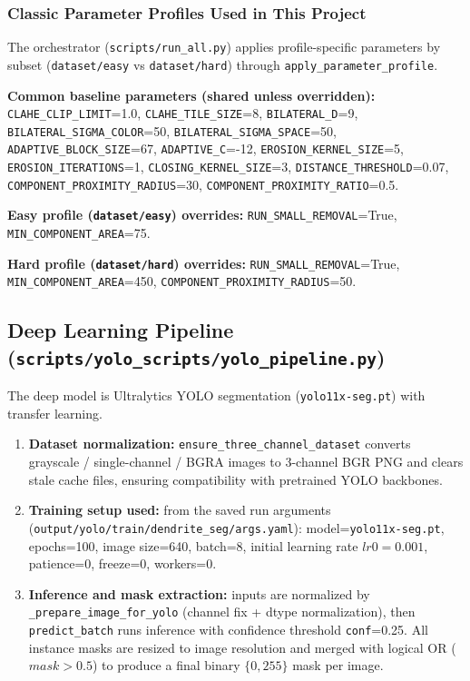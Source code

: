 \documentclass[11pt,a4paper]{article}
\begin{document}
\subsubsection*{Classic Parameter Profiles Used in This Project}
The orchestrator (\texttt{scripts/run\_all.py}) applies profile-specific parameters by subset (\texttt{dataset/easy} vs \texttt{dataset/hard}) through \texttt{apply\_parameter\_profile}.

\textbf{Common baseline parameters (shared unless overridden):}
\texttt{CLAHE\_CLIP\_LIMIT}=1.0,
\texttt{CLAHE\_TILE\_SIZE}=8,
\texttt{BILATERAL\_D}=9,
\texttt{BILATERAL\_SIGMA\_COLOR}=50,
\texttt{BILATERAL\_SIGMA\_SPACE}=50,
\texttt{ADAPTIVE\_BLOCK\_SIZE}=67,
\texttt{ADAPTIVE\_C}=-12,
\texttt{EROSION\_KERNEL\_SIZE}=5,
\texttt{EROSION\_ITERATIONS}=1,
\texttt{CLOSING\_KERNEL\_SIZE}=3,
\texttt{DISTANCE\_THRESHOLD}=0.07,
\texttt{COMPONENT\_PROXIMITY\_RADIUS}=30,
\texttt{COMPONENT\_PROXIMITY\_RATIO}=0.5.

\textbf{Easy profile (\texttt{dataset/easy}) overrides:}
\texttt{RUN\_SMALL\_REMOVAL}=True,
\texttt{MIN\_COMPONENT\_AREA}=75.

\textbf{Hard profile (\texttt{dataset/hard}) overrides:}
\texttt{RUN\_SMALL\_REMOVAL}=True,
\texttt{MIN\_COMPONENT\_AREA}=450,
\texttt{COMPONENT\_PROXIMITY\_RADIUS}=50.

\subsection*{Deep Learning Pipeline (\texttt{scripts/yolo\_scripts/yolo\_pipeline.py})}
The deep model is Ultralytics YOLO segmentation (\texttt{yolo11x-seg.pt}) with transfer learning.
\begin{enumerate}
\item \textbf{Dataset normalization:}
\texttt{ensure\_three\_channel\_dataset} converts grayscale / single-channel / BGRA images to 3-channel BGR PNG and clears stale cache files, ensuring compatibility with pretrained YOLO backbones.

\item \textbf{Training setup used:}
from the saved run arguments (\texttt{output/yolo/train/dendrite\_seg/args.yaml}): model=\texttt{yolo11x-seg.pt}, epochs=100, image size=640, batch=8, initial learning rate \(lr0=0.001\), patience=0, freeze=0, workers=0.

\item \textbf{Inference and mask extraction:}
inputs are normalized by \texttt{\_prepare\_image\_for\_yolo} (channel fix + dtype normalization), then \texttt{predict\_batch} runs inference with confidence threshold \texttt{conf}=0.25. All instance masks are resized to image resolution and merged with logical OR (\(mask > 0.5\)) to produce a final binary \(\{0,255\}\) mask per image.
\end{enumerate}
\end{document}
